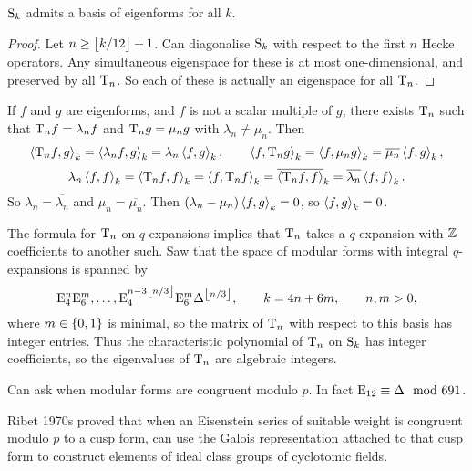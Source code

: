 \begin{corollary}
$ \S_k $ admits a basis of eigenforms for all $ k $.
\end{corollary}

\begin{proof}
Let $ n \ge \fbr{k / 12} + 1 $. Can diagonalise $ \S_k $ with respect to the first $ n $ Hecke operators. Any simultaneous eigenspace for these is at most one-dimensional, and preserved by all $ \T_n $. So each of these is actually an eigenspace for all $ \T_n $.
\end{proof}


\begin{note*}
If $ f $ and $ g $ are eigenforms, and $ f $ is not a scalar multiple of $ g $, there exists $ \T_n $ such that $ \T_nf = \lambda_nf $ and $ \T_ng = \mu_ng $ with $ \lambda_n \ne \mu_n $. Then
$$ \abr{\T_nf, g}_k = \abr{\lambda_nf, g}_k = \lambda_n\abr{f, g}_k, \qquad \abr{f, \T_ng}_k = \abr{f, \mu_ng}_k = \overline{\mu_n}\abr{f, g}_k, $$
$$ \lambda_n\abr{f, f}_k = \abr{\T_nf, f}_k = \abr{f, \T_nf}_k = \overline{\abr{\T_nf, f}}_k = \overline{\lambda_n}\abr{f, f}_k. $$
So $ \lambda_n = \overline{\lambda_n} $ and $ \mu_n = \overline{\mu_n} $. Then $ \br{\lambda_n - \mu_n}\abr{f, g}_k = 0 $, so $ \abr{f, g}_k = 0 $.
\end{note*}

The formula for $ \T_n $ on $ q $-expansions implies that $ \T_n $ takes a $ q $-expansion with $ \ZZ $ coefficients to another such. Saw that the space of modular forms with integral $ q $-expansions is spanned by
$$ \E_4^n\E_6^m, \dots, \E_4^{n - 3\fbr{n / 3}}\E_6^m\Delta^{\fbr{n / 3}}, \qquad k = 4n + 6m, \qquad n, m > 0, $$
where $ m \in \cbr{0, 1} $ is minimal, so the matrix of $ \T_n $ with respect to this basis has integer entries. Thus the characteristic polynomial of $ \T_n $ on $ \S_k $ has integer coefficients, so the eigenvalues of $ \T_n $ are algebraic integers.

\begin{example*}
Can ask when modular forms are congruent modulo $ p $. In fact $ \E_{12} \equiv \Delta \mod 691 $.
\end{example*}

Ribet 1970s proved that when an Eisenstein series of suitable weight is congruent modulo $ p $ to a cusp form, can use the Galois representation attached to that cusp form to construct elements of ideal class groups of cyclotomic fields.

